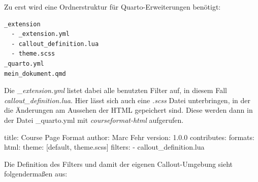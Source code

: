 \documentclass[
  letterpaper,
  DIV=11]{scrartcl}
\newenvironment{Shaded}{\begin{snugshade}}{\end{snugshade}}
\newcommand{\AttributeTok}[1]{\textcolor[rgb]{0.40,0.45,0.13}{#1}}
\newcommand{\FloatTok}[1]{\textcolor[rgb]{0.68,0.00,0.00}{#1}}
\newcommand{\FunctionTok}[1]{\textcolor[rgb]{0.28,0.35,0.67}{#1}}
\newcommand{\KeywordTok}[1]{\textcolor[rgb]{0.00,0.23,0.31}{#1}}
\begin{document}
Zu erst wird eine Ordnerstruktur für Quarto-Erweiterungen benötigt:

\begin{verbatim}
_extension
  - _extension.yml
  - callout_definition.lua
  - theme.scss
_quarto.yml
mein_dokument.qmd
\end{verbatim}

Die \_\emph{extension.yml} listet dabei alle benutzten Filter auf, in
diesem Fall \emph{callout\_definition.lua}. Hier lässt sich auch eine
\emph{.scss} Datei unterbringen, in der die Änderungen am Aussehen der
HTML gepeichert sind. Diese werden dann in der Datei \_quarto.yml mit
\emph{courseformat-html} aufgerufen.

\begin{Shaded}
\begin{Highlighting}[]
\FunctionTok{title}\KeywordTok{:}\AttributeTok{ Course Page Format}
\FunctionTok{author}\KeywordTok{:}\AttributeTok{ Marc Fehr}
\FunctionTok{version}\KeywordTok{:}\AttributeTok{ }\FloatTok{1.0.0}
\FunctionTok{contributes}\KeywordTok{:}
\AttributeTok{  }\FunctionTok{formats}\KeywordTok{:}
\AttributeTok{    }\FunctionTok{html}\KeywordTok{:}
\AttributeTok{      }\FunctionTok{theme}\KeywordTok{:}\AttributeTok{ }\KeywordTok{[}\AttributeTok{default}\KeywordTok{,}\AttributeTok{ theme.scss}\KeywordTok{]}
\AttributeTok{  }\FunctionTok{filters}\KeywordTok{:}
\AttributeTok{    }\KeywordTok{{-}}\AttributeTok{ callout\_definition.lua}
\end{Highlighting}
\end{Shaded}

Die Definition des Filters und damit der eigenen Callout-Umgebung sieht
folgendermaßen aus:
\end{document}
